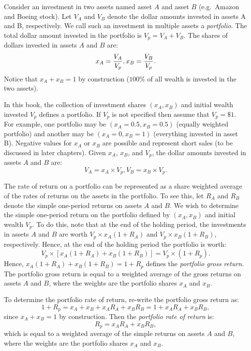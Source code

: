 \documentclass[
  letterpaper,
  DIV=11,
  numbers=noendperiod]{scrreprt}
\theoremstyle{definition}
\theoremstyle{definition}
\theoremstyle{remark}
\begin{document}
 Consider an investment in two assets named
asset \(A\) and asset \(B\) (e.g.~Amazon and Boeing stock). Let
\(V_{A}\) and \(V_{B}\) denote the dollar amounts invested in assets A
and B, respectively. We call such an investment in multiple assets a
\emph{portfolio}. The total dollar amount invested in the portfolio is
\(V_p = V_A + V_B\). The shares of dollars invested in assets \(A\) and
\(B\) are: \[x_A = \frac{V_A}{V_p}, \space x_B = \frac{V_B}{V_p}.\]
Notice that \(x_A + x_B = 1\) by construction (\(100\%\) of all wealth
is invested in the two assets).

In this book, the collection of investment shares \((x_{A},x_{B})\) and
initial wealth invested \(V_p\) defines a portfolio. If \(V_p\) is not
specified then assume that \(V_p=\$1\). For example, one portfolio may
be \((x_{A}=0.5,x_{B}=0.5)\) (equally weighted portfolio) and another
may be \((x_{A}=0,x_{B}=1)\) (everything invested in asset B). Negative
values for \(x_{A}\) or \(x_{B}\) are possible and represent short sales
(to be discussed in later chapters). Given \(x_A\), \(x_B\), and
\(V_p\), the dollar amounts invested in assets \(A\) and \(B\) are:
\[V_A =  x_{A} \times V_p, V_B = x_{B} \times V_{p}.\]

The rate of return on a portfolio can be represented as a share weighted
average of the rates of returns on the assets in the portfolio. To see
this, let \(R_{A}\) and \(R_{B}\) denote the simple one-period returns
on assets \(A\) and \(B\). We wish to determine the simple one-period
return on the portfolio defined by \((x_{A},x_{B})\) and initial wealth
\(V_p\). To do this, note that at the end of the holding period, the
investments in assets \(A\) and \(B\) are worth
\(V_p \times x_{A}(1+R_{A})\) and \(V_p\times x_{B}(1+R_{B})\),
respectively. Hence, at the end of the holding period the portfolio is
worth:
\[V_p\times\left[x_{A}(1+R_{A})+x_{B}(1+R_{B})\right] = V_p \times (1 + R_{p}).\]
Hence, \(x_{A}(1+R_{A})+x_{B}(1+R_{B})=1+R_p\) defines the
\emph{portfolio gross return}. The portfolio gross return is equal to a
weighted average of the gross returns on assets \(A\) and \(B\), where
the weights are the portfolio shares \(x_{A}\) and \(x_{B}\).

To determine the portfolio rate of return, re-write the portfolio gross
return as:
\[1+R_{p}=x_{A}+x_{B}+x_{A}R_{A}+x_{B}R_{B}=1+x_{A}R_{A}+x_{B}R_{B},\]
since \(x_{A}+x_{B}=1\) by construction. Then the \emph{portfolio rate
of return} is: \[R_{p}=x_{A}R_{A}+x_{B}R_{B},\] which is equal to a
weighted average of the simple returns on assets \(A\) and \(B\), where
the weights are the portfolio shares \(x_{A}\) and \(x_{B}\).
\end{document}

